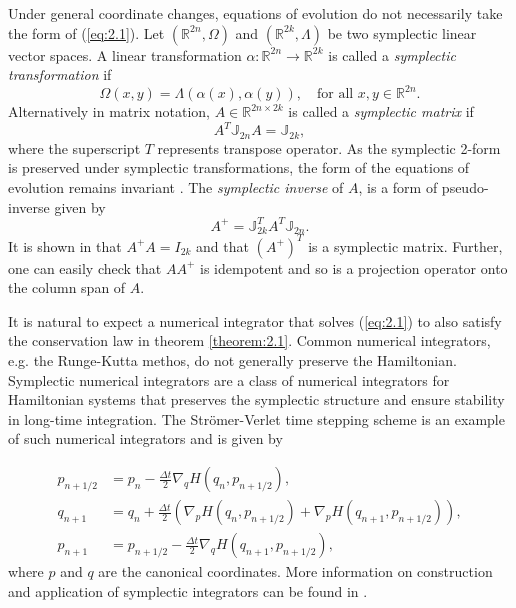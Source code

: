 Under general coordinate changes, equations of evolution do not necessarily take the form of (\ref{eq:2.1}). Let $(\mathbb R^{2n},\Omega)$ and $(\mathbb R^{2k},\Lambda)$ be two symplectic linear vector spaces. A linear transformation $\alpha :\mathbb R^{2n} \to \mathbb R^{2k}$ is called a \emph{symplectic transformation} \cite{Marsden:2010:IMS:1965128} if
\begin{equation}
	\Omega(x,y) = \Lambda(\alpha(x),\alpha(y)), \quad \text{for all } x,y\in \mathbb R^{2n}.
\end{equation}
Alternatively in matrix notation, $A\in \mathbb R^{2n\times 2k}$ is called a \emph{symplectic matrix} if
\begin{equation}
	A^T \mathbb{J}_{2n} A = \mathbb{J}_{2k},
\end{equation}
where the superscript $T$ represents transpose operator. As the symplectic 2-form is preserved under symplectic transformations, the form of the equations of evolution remains invariant \cite{Marsden:2010:IMS:1965128}. The \emph{symplectic inverse} of $A$, is a form of pseudo-inverse given by
\begin{equation}
	A^+ = \mathbb{\mathbb J}_{2k}^T A^T \mathbb J_{2n}.
\end{equation}
It is shown in \cite{Peng:2014di} that $A^+A = I_{2k}$ and that $(A^+)^T$ is a symplectic matrix. Further, one can easily check that $AA^+$ is idempotent and so is a projection operator onto the column span of $A$. 

It is natural to expect a numerical integrator that solves (\ref{eq:2.1}) to also satisfy the conservation law in theorem \ref{theorem:2.1}. Common numerical integrators, e.g. the Runge-Kutta methos, do not generally preserve the Hamiltonian. Symplectic numerical integrators are a class of numerical integrators for Hamiltonian systems that preserves the symplectic structure and ensure stability in long-time integration. The Str\"omer-Verlet time stepping scheme is an example of such numerical integrators and is given by

\begin{equation} \label{eq:2.3}
\begin{aligned}
	p_{n+1/2} &= p_n - \frac{\Delta t}{2} \nabla_qH(q_{n},p_{n+1/2}), \\
	q_{n+1} &= q_n + \frac{\Delta t}{2} \left( \nabla_pH(q_{n},p_{n+1/2}) + \nabla_pH(q_{n+1},p_{n+1/2}) \right),\\
	p_{n+1} &= p_{n+1/2} - \frac{\Delta t}{2} \nabla_qH(q_{n+1},p_{n+1/2}),
\end{aligned}
\end{equation}
where $p$ and $q$ are the canonical coordinates. More information on construction and application of symplectic integrators can be found in \cite{Hairer:1250576}.

